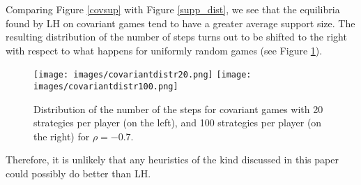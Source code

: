 \documentclass[11pt]{article}
\begin{document}
Comparing Figure \ref{covsup} with Figure \ref{supp_dist}, we see that
the equilibria found by LH
on covariant games tend to have a greater average support size.
The resulting distribution of the number of steps turns out to be
shifted to the right
with respect to what happens for uniformly random games (see Figure
\ref{covdis}).

\begin{figure}[h]
\centering
\texttt{[image: images/covariantdistr20.png]}
\texttt{[image: images/covariantdistr100.png]}
\caption{Distribution of the number of the steps for covariant games
with 20 strategies per
player (on the left), and 100 strategies per player (on the right) for
$\rho = -0.7$.}
\label{covdis}
\end{figure}

Therefore, it is unlikely that any heuristics of the kind discussed
in this paper could possibly do better than LH.
\end{document}
